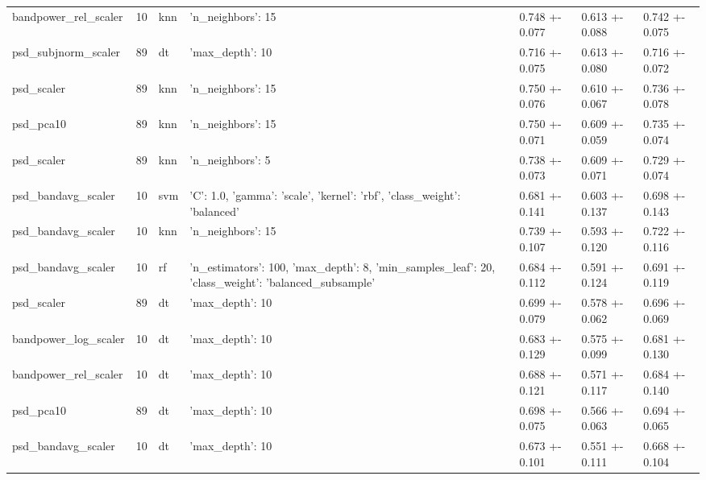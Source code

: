 \begin{longtable}{lrlllll}
bandpower_rel_scaler & 10 & knn & {'n_neighbors': 15} & 0.748 +- 0.077 & 0.613 +- 0.088 & 0.742 +- 0.075 \\
psd_subjnorm_scaler & 89 & dt & {'max_depth': 10} & 0.716 +- 0.075 & 0.613 +- 0.080 & 0.716 +- 0.072 \\
psd_scaler & 89 & knn & {'n_neighbors': 15} & 0.750 +- 0.076 & 0.610 +- 0.067 & 0.736 +- 0.078 \\
psd_pca10 & 89 & knn & {'n_neighbors': 15} & 0.750 +- 0.071 & 0.609 +- 0.059 & 0.735 +- 0.074 \\
psd_scaler & 89 & knn & {'n_neighbors': 5} & 0.738 +- 0.073 & 0.609 +- 0.071 & 0.729 +- 0.074 \\
psd_bandavg_scaler & 10 & svm & {'C': 1.0, 'gamma': 'scale', 'kernel': 'rbf', 'class_weight': 'balanced'} & 0.681 +- 0.141 & 0.603 +- 0.137 & 0.698 +- 0.143 \\
psd_bandavg_scaler & 10 & knn & {'n_neighbors': 15} & 0.739 +- 0.107 & 0.593 +- 0.120 & 0.722 +- 0.116 \\
psd_bandavg_scaler & 10 & rf & {'n_estimators': 100, 'max_depth': 8, 'min_samples_leaf': 20, 'class_weight': 'balanced_subsample'} & 0.684 +- 0.112 & 0.591 +- 0.124 & 0.691 +- 0.119 \\
psd_scaler & 89 & dt & {'max_depth': 10} & 0.699 +- 0.079 & 0.578 +- 0.062 & 0.696 +- 0.069 \\
bandpower_log_scaler & 10 & dt & {'max_depth': 10} & 0.683 +- 0.129 & 0.575 +- 0.099 & 0.681 +- 0.130 \\
bandpower_rel_scaler & 10 & dt & {'max_depth': 10} & 0.688 +- 0.121 & 0.571 +- 0.117 & 0.684 +- 0.140 \\
psd_pca10 & 89 & dt & {'max_depth': 10} & 0.698 +- 0.075 & 0.566 +- 0.063 & 0.694 +- 0.065 \\
psd_bandavg_scaler & 10 & dt & {'max_depth': 10} & 0.673 +- 0.101 & 0.551 +- 0.111 & 0.668 +- 0.104 \\
\end{longtable}
